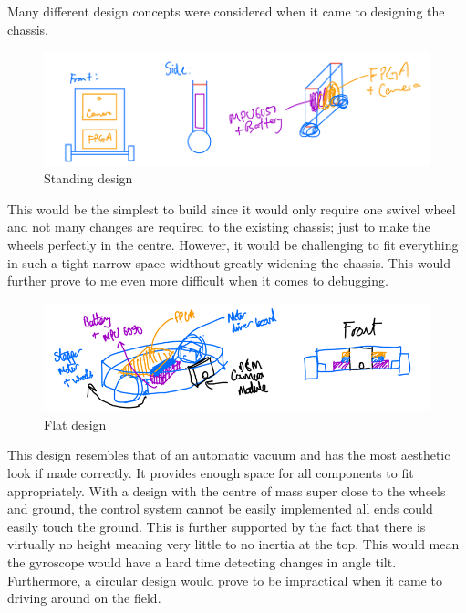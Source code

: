 Many different design concepts were considered when it came to designing the chassis. 

\begin{figure}
    \centering
    \includegraphics[width=0.8\linewidth]{images/chassis-drawing1.png}
    \caption{Standing design}
\end{figure}

This would be the simplest to build since it would only require one swivel wheel and not many changes are required to the existing chassis; just to make the wheels perfectly in the centre. However, it would be challenging to fit everything in such a tight narrow space widthout greatly widening the chassis. This would further prove to me even more difficult when it comes to debugging.

\begin{figure}
    \centering
    \includegraphics[width=0.8\linewidth]{images/chassis-drawing2.png}
    \caption{Flat design}
\end{figure}

This design resembles that of an automatic vacuum and has the most aesthetic look if made correctly. It provides enough space for all components to fit appropriately. With a design with the centre of mass super close to the wheels and ground, the control system cannot be easily implemented all ends could easily touch the ground. This is further supported by the fact that there is virtually no height meaning very little to no inertia at the top. This would mean the gyroscope would have a hard time detecting changes in angle tilt. Furthermore, a circular design would prove to be impractical when it came to driving around on the field.

\newpage

